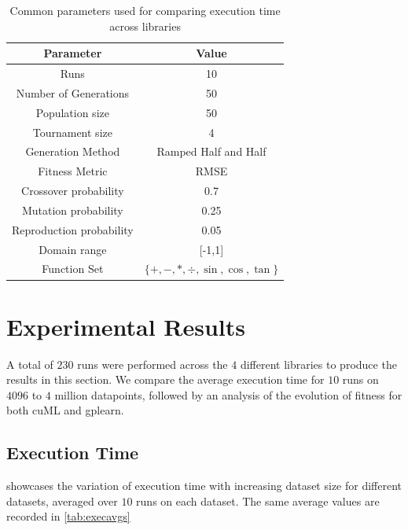 \begin{table}[htbp]
  \caption{Common parameters used for comparing execution time across libraries}
  \begin{center}
    \begin{tabular}[c]{cc}
      \toprule
      \textbf{Parameter} & \textbf{Value} \\
      \midrule
      Runs                      & 10      \\
      Number of Generations     & 50      \\
      Population size           & 50      \\
      Tournament size           & 4       \\ 
      Generation Method         & Ramped Half and Half \\
      Fitness Metric            & RMSE    \\
      Crossover probability     & 0.7     \\
      Mutation probability      & 0.25    \\
      Reproduction probability  & 0.05    \\
      Domain range              & [-1,1]  \\
      Function Set              & $\{+,-,*,\div,\sin ,\cos,\tan\}$ \\
      \bottomrule
    \end{tabular}
    \label{tab:params}
  \end{center}
\end{table}

\section{Experimental Results}
\label{sec:results}
A total of $230$ runs were performed across the $4$ different libraries to produce the results in this section. We compare the average execution time for $10$ runs on $4096$ to $4$ million datapoints, followed by an analysis of the evolution of fitness for both cuML and gplearn.

\subsection{Execution Time}
\label{subsec:exectimes}
 showcases the variation of execution time with increasing dataset size for different datasets, averaged over $10$ runs on each dataset. The same average values are recorded in \cref{tab:execavgs}

